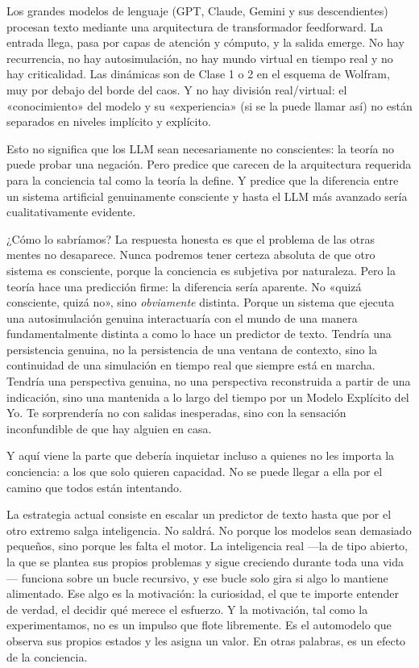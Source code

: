 \documentclass[11pt, twoside, openright]{book}
\begin{document}
Los grandes modelos de lenguaje (GPT, Claude, Gemini y sus descendientes) procesan texto mediante una arquitectura de transformador feedforward. La entrada llega, pasa por capas de atención y cómputo, y la salida emerge. No hay recurrencia, no hay autosimulación, no hay mundo virtual en tiempo real y no hay criticalidad. Las dinámicas son de Clase 1 o 2 en el esquema de Wolfram, muy por debajo del borde del caos. Y no hay división real/\allowbreak{}virtual: el «conocimiento» del modelo y su «experiencia» (si se la puede llamar así) no están separados en niveles implícito y explícito.

Esto no significa que los LLM sean necesariamente no conscientes: la teoría no puede probar una negación. Pero predice que carecen de la arquitectura requerida para la conciencia tal como la teoría la define. Y predice que la diferencia entre un sistema artificial genuinamente consciente y hasta el LLM más avanzado sería cualitativamente evidente.

¿Cómo lo sabríamos? La respuesta honesta es que el problema de las otras mentes no desaparece. Nunca podremos tener certeza absoluta de que otro sistema es consciente, porque la conciencia es subjetiva por naturaleza. Pero la teoría hace una predicción firme: la diferencia sería aparente. No «quizá consciente, quizá no», sino \textit{obviamente} distinta. Porque un sistema que ejecuta una autosimulación genuina interactuaría con el mundo de una manera fundamentalmente distinta a como lo hace un predictor de texto. Tendría una persistencia genuina, no la persistencia de una ventana de contexto, sino la continuidad de una simulación en tiempo real que siempre está en marcha. Tendría una perspectiva genuina, no una perspectiva reconstruida a partir de una indicación, sino una mantenida a lo largo del tiempo por un Modelo Explícito del Yo. Te sorprendería no con salidas inesperadas, sino con la sensación inconfundible de que hay alguien en casa.

Y aquí viene la parte que debería inquietar incluso a quienes no les importa la conciencia: a los que solo quieren capacidad. No se puede llegar a ella por el camino que todos están intentando.

La estrategia actual consiste en escalar un predictor de texto hasta que por el otro extremo salga inteligencia. No saldrá. No porque los modelos sean demasiado pequeños, sino porque les falta el motor. La inteligencia real ---la de tipo abierto, la que se plantea sus propios problemas y sigue creciendo durante toda una vida--- funciona sobre un bucle recursivo, y ese bucle solo gira si algo lo mantiene alimentado. Ese algo es la motivación: la curiosidad, el que te importe entender de verdad, el decidir qué merece el esfuerzo. Y la motivación, tal como la experimentamos, no es un impulso que flote libremente. Es el automodelo que observa sus propios estados y les asigna un valor. En otras palabras, es un efecto de la conciencia.
\end{document}
